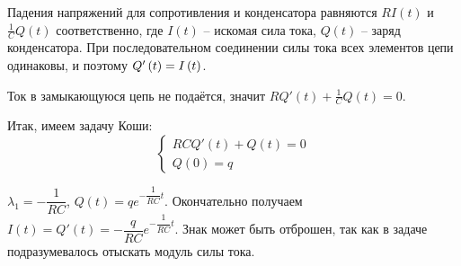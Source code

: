 \documentclass[a5paper,10pt]{article}
\newcommand{\br}[1]{\left(#1\right)}
\begin{document}
Падения напряжений для сопротивления и конденсатора равняются $RI\br{t}$ и $\frac {1}{C} Q\br{t}$ соответственно, где $I\br{t}$ -- искомая сила тока, $Q\br{t}$ -- заряд конденсатора. При последовательном соединении силы тока всех элементов цепи одинаковы, и поэтому $Q'\br{t} = \linebreak I\br{t}$.

Ток в замыкающуюся цепь не подаётся, значит $RQ'\br{t} + \frac {1} {C} Q\br{t} = 0$.

Итак, имеем задачу Коши:
$$\begin{cases}
    RCQ'\br{t} + Q\br{t} = 0 \\
    Q\br{0} = q
\end{cases}$$

$\lambda_{1} = -\dfrac{1}{RC}$, $Q\br{t} = q e^{-\dfrac {1} {RC} \displaystyle{t}}$. Окончательно получаем $I\br{t} = Q'\br{t} = -\dfrac{q}{RC} e^{-\dfrac {1} {RC} \displaystyle{t}}$.
Знак может быть отброшен, так как в задаче подразумевалось отыскать модуль силы тока.
\end{document}
